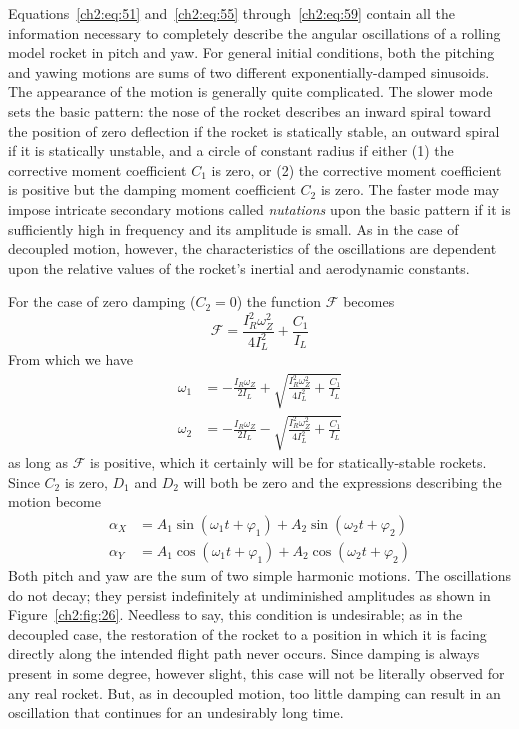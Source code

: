 Equations~\eqref{ch2:eq:51} and~\eqref{ch2:eq:55} through~\eqref{ch2:eq:59}
contain all the information necessary to completely describe the angular
oscillations of a rolling model rocket in pitch and yaw. For general initial
conditions, both the pitching and yawing motions are sums of two different
exponentially-damped sinusoids. The appearance of the motion is generally
quite complicated. The slower mode sets the basic pattern: the nose of the
rocket describes an inward spiral toward the position of zero deflection if
the rocket is statically stable, an outward spiral if it is statically
unstable, and a circle of constant radius if either (1) the corrective moment
coefficient $C_1$ is zero, or (2) the corrective moment coefficient is
positive but the damping moment coefficient $C_2$ is zero. The faster mode may
impose intricate secondary motions called \emph{nutations} upon the basic
pattern if it is sufficiently high in frequency and its amplitude is small. As
in the case of decoupled motion, however, the characteristics of the
oscillations are dependent upon the relative values of the rocket's inertial
and aerodynamic constants.

For the case of zero damping ($C_2 = 0$) the function $\mathscr{F}$ becomes
\begin{equation*}
\mathscr{F} = \frac{I_R^2\omega_Z^2}{4I_L^2} + \frac{C_1}{I_L}
\end{equation*}
From which we have
\begin{align*}
\omega_1 &= -\frac{I_R\omega_Z}{2I_L}
  + \sqrt{\frac{I_R^2\omega_Z^2}{4I_L^2} + \frac{C_1}{I_L}}\\
\omega_2 &= -\frac{I_R\omega_Z}{2I_L}
  - \sqrt{\frac{I_R^2\omega_Z^2}{4I_L^2} + \frac{C_1}{I_L}}
\end{align*}
as long as $\mathscr{F}$ is positive, which it certainly will be for
statically-stable rockets. Since $C_2$ is zero, $D_1$ and $D_2$ will both be
zero and the expressions describing the motion become
\begin{subequations}\label{ch2:eq:60}
\begin{align}
\alpha_X &= A_1\sin(\omega_1 t + \varphi_1)
  + A_2\sin(\omega_2 t + \varphi_2) \label{ch2:eq:60a}\\
\alpha_Y &= A_1\cos(\omega_1 t + \varphi_1)
  + A_2\cos(\omega_2 t + \varphi_2) \label{ch2:eq:60b}
\end{align}
\end{subequations}
Both pitch and yaw are the sum of two simple harmonic motions. The
oscillations do not decay; they persist indefinitely at undiminished
amplitudes as shown in Figure~\ref{ch2:fig:26}. Needless to say, this
condition is undesirable; as in the decoupled case, the restoration of the
rocket to a position in which it is facing directly along the intended flight
path never occurs. Since damping is always present in some degree, however
slight, this case will not be literally observed for any real rocket. But, as
in decoupled motion, too little damping can result in an oscillation that
continues for an undesirably long time.

